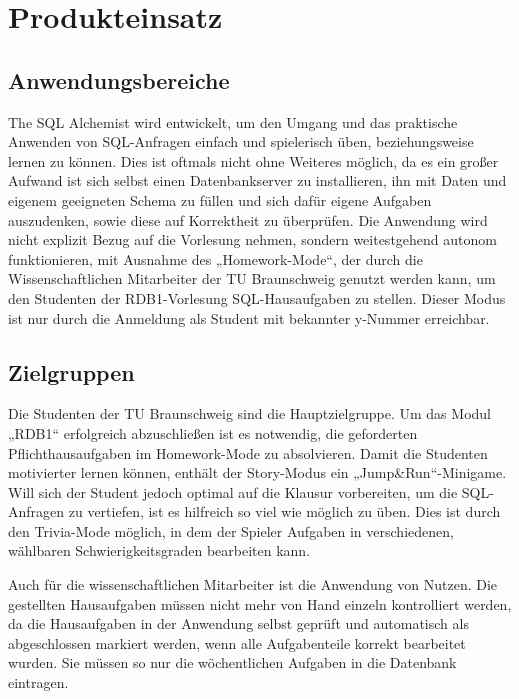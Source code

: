 
\chapter{Produkteinsatz}

\section{Anwendungsbereiche}
The SQL Alchemist wird entwickelt, um den Umgang und das praktische Anwenden von SQL-Anfragen einfach und spielerisch üben, beziehungsweise lernen zu können.
Dies ist oftmals nicht ohne Weiteres möglich, da es ein großer Aufwand ist sich selbst einen Datenbankserver zu installieren, ihn mit Daten und eigenem geeigneten Schema 
zu füllen und sich dafür eigene Aufgaben auszudenken, sowie diese auf Korrektheit zu überprüfen.
Die Anwendung wird nicht explizit Bezug auf die Vorlesung nehmen, sondern weitestgehend autonom funktionieren, mit Ausnahme des „Homework-Mode“, der durch die 
Wissenschaftlichen Mitarbeiter der TU Braunschweig genutzt werden kann, um den Studenten der RDB1-Vorlesung SQL-Hausaufgaben zu stellen.
Dieser Modus ist nur durch die Anmeldung als Student mit bekannter y-Nummer erreichbar.

\section{Zielgruppen}
Die Studenten der TU Braunschweig sind die Hauptzielgruppe. Um das Modul „RDB1“ erfolgreich abzuschließen ist es notwendig, die geforderten Pflichthausaufgaben im 
Homework-Mode zu absolvieren. Damit die Studenten motivierter lernen können, enthält der Story-Modus ein „Jump\&Run“-Minigame. 
Will sich der Student jedoch optimal auf die Klausur vorbereiten, um die SQL-Anfragen zu vertiefen, ist es hilfreich so viel wie möglich zu üben. 
Dies ist durch den Trivia-Mode möglich, in dem der Spieler Aufgaben in verschiedenen, wählbaren Schwierigkeitsgraden bearbeiten kann.

Auch für die wissenschaftlichen Mitarbeiter ist die Anwendung von Nutzen. Die gestellten Hausaufgaben müssen nicht mehr von Hand einzeln kontrolliert werden, 
da die Hausaufgaben in der Anwendung selbst geprüft und automatisch als abgeschlossen markiert werden, wenn alle Aufgabenteile korrekt bearbeitet wurden.
Sie müssen so nur die wöchentlichen Aufgaben in die Datenbank eintragen.

